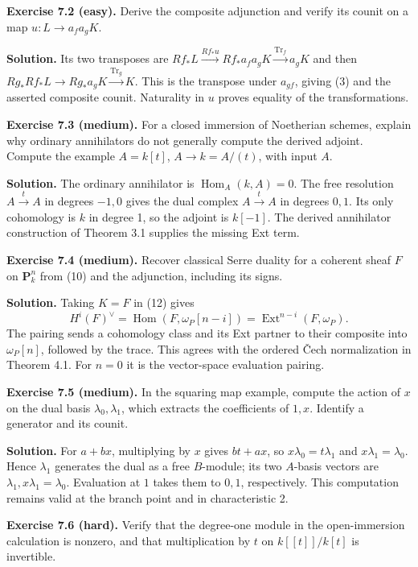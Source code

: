 \documentclass[11pt]{article}
\begin{document}
\textbf{Exercise 7.2 (easy).} Derive the composite adjunction and verify
its counit on a map \(u:L\to a_fa_gK\).

\textbf{Solution.} Its two transposes are
\(Rf_*L\xrightarrow{Rf_*u}Rf_*a_fa_gK\xrightarrow{\operatorname{Tr}_f}a_gK\)
and then \(Rg_*Rf_*L\to Rg_*a_gK\xrightarrow{\operatorname{Tr}_g}K\).
This is the transpose under \(a_{gf}\), giving (3) and the asserted
composite counit. Naturality in \(u\) proves equality of the
transformations.

\textbf{Exercise 7.3 (medium).} For a closed immersion of Noetherian
schemes, explain why ordinary annihilators do not generally compute the
derived adjoint. Compute the example \(A=k[t]\), \(A\to k=A/(t)\), with
input \(A\).

\textbf{Solution.} The ordinary annihilator is
\(\operatorname{Hom}_A(k,A)=0\). The free resolution
\(A\xrightarrow tA\) in degrees \(-1,0\) gives the dual complex
\(A\xrightarrow tA\) in degrees \(0,1\). Its only cohomology is \(k\) in
degree 1, so the adjoint is \(k[-1]\). The derived annihilator
construction of Theorem 3.1 supplies the missing Ext term.

\textbf{Exercise 7.4 (medium).} Recover classical Serre duality for a
coherent sheaf \(F\) on \(\mathbf P^n_k\) from (10) and the adjunction,
including its signs.

\textbf{Solution.} Taking \(K=F\) in (12) gives \[
H^i(F)^\vee=\operatorname{Hom}(F,\omega_P[n-i])
 =\operatorname{Ext}^{n-i}(F,\omega_P).
\] The pairing sends a cohomology class and its Ext partner to their
composite into \(\omega_P[n]\), followed by the trace. This agrees with
the ordered Čech normalization in Theorem 4.1. For \(n=0\) it is the
vector-space evaluation pairing.

\textbf{Exercise 7.5 (medium).} In the squaring map example, compute the
action of \(x\) on the dual basis \(\lambda_0,\lambda_1\), which
extracts the coefficients of \(1,x\). Identify a generator and its
counit.

\textbf{Solution.} For \(a+bx\), multiplying by \(x\) gives \(bt+ax\),
so \(x\lambda_0=t\lambda_1\) and \(x\lambda_1=\lambda_0\). Hence
\(\lambda_1\) generates the dual as a free \(B\)-module; its two
\(A\)-basis vectors are \(\lambda_1,x\lambda_1=\lambda_0\). Evaluation
at \(1\) takes them to \(0,1\), respectively. This computation remains
valid at the branch point and in characteristic 2.

\textbf{Exercise 7.6 (hard).} Verify that the degree-one module in the
open-immersion calculation is nonzero, and that multiplication by \(t\)
on \(k[[t]]/k[t]\) is invertible.
\end{document}
